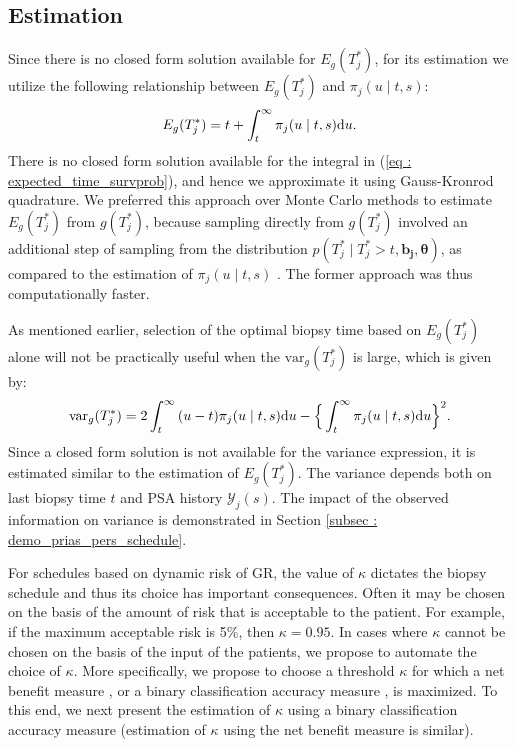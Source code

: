 
\subsection{Estimation}
Since there is no closed form solution available for $E_g(T^*_j)$, for its estimation we utilize the following relationship between $E_g(T^*_j)$ and $\pi_j(u \mid t, s)$:
\begin{equation}
\label{eq : expected_time_survprob}
E_g(T^*_j) = t + \int_t^\infty \pi_j(u \mid t, s) \rmn{d} u.
\end{equation}
There is no closed form solution available for the integral in (\ref{eq : expected_time_survprob}), and hence we approximate it using Gauss-Kronrod quadrature. We preferred this approach over Monte Carlo methods to estimate $E_g(T^*_j)$ from $g(T^*_j)$, because sampling directly from $g(T^*_j)$ involved an additional step of sampling from the distribution $p(T^*_j \mid T^*_j > t, \boldsymbol{b_j}, \boldsymbol{\theta})$, as compared to the estimation of $\pi_j(u \mid t, s)$ \citep{rizopoulos2011dynamic}. The former approach was thus computationally faster. 

As mentioned earlier, selection of the optimal biopsy time based on $E_g(T_j^*)$ alone will not be practically useful when the $\mbox{var}_g(T^*_j)$ is large, which is given by:
\begin{equation}
\label{eq : var_time_survprob}
\mbox{var}_g(T^*_j) = 2 \int_t^\infty {(u-t) \pi_j(u \mid t, s) \rmn{d} u} - \Big\{\int_t^\infty \pi_j(u \mid t, s) \rmn{d} u\Big\}^2.
\end{equation}
Since a closed form solution is not available for the variance expression, it is estimated similar to the estimation of $E_g(T^*_j)$. The variance depends both on last biopsy time $t$ and PSA history $\mathcal{Y}_j(s)$. The impact of the observed information on variance is demonstrated in Section \ref{subsec : demo_prias_pers_schedule}.

For schedules based on dynamic risk of GR, the value of $\kappa$ dictates the biopsy schedule and thus its choice has important consequences. Often it may be chosen on the basis of the amount of risk that is acceptable to the patient. For example, if the maximum acceptable risk is 5\%, then $\kappa = 0.95$. In cases where $\kappa$ cannot be chosen on the basis of the input of the patients, we propose to automate the choice of $\kappa$. More specifically, we propose to choose a threshold $\kappa$ for which a net benefit measure \citep{vickers2006decision}, or a binary classification accuracy measure \citep{lopez2014optimalcutpoints}, is maximized. To this end, we next present the estimation of $\kappa$ using a binary classification accuracy measure (estimation of $\kappa$ using the net benefit measure is similar). 

